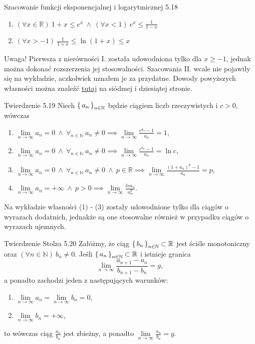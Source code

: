 \documentclass{article}
\newcommand{\R}{\mathbb{R}}
\newcommand{\N}{\mathbb{N}}
\newcommand{\lin}[1]{\lim\limits_{n\to\infty}{#1}}
\newcommand{\seq}[1]{\set{#1_n}_{n\in\N}}
\begin{document}
\begin{twier}{Szacowanie funkcji eksponencjalnej i logarytmicznej 5.18}
    \begin{enumerate}[label=\Roman*.]
        \item $(\forall x\in\R)\ 1+x\le e^x\ \land\ (\forall x<1)\ e^x\le \frac{1}{1-x}$
        \item $(\forall x>-1)\ \frac{1}{1+x}\le \ln{(1+x)}\le x$
    \end{enumerate}
\end{twier}

Uwaga! Pierwsza z nierówności I. została udowodniona tylko dla $x\ge -1$, jednak można
dokonać rozszerzenia jej stosowalności. Szacowania II. wcale nie pojawiły się na wykładzie, aczkolwiek uznałem je
za przydatne. Dowody powyższych własności można znaleźć 
\href{https://drive.google.com/file/d/1cHNY7oU4XpRmYcPfO8lCgPCpdmvKQY5q/view?usp=sharing}{{\color{blue}\underline{tutaj}}}
na siódmej i dziesiątej stronie.

\begin{twier}{Twierdzenie 5.19}
Niech $\seq{a}$ będzie ciągiem liczb rzeczywistych i $c>0$, wówczas
\begin{enumerate}[label=(\arabic*)]
    \item $\lin{a_n}=0\ \land\ \forall_{n\in\N}\ a_n\neq0\implies\lin{\frac{e^{a_n}-1}{a_n}}=1$,
    \item $\lin{a_n}=0\ \land\ \forall_{n\in\N}\ a_n\neq0\implies\lin{\frac{c^{a_n}-1}{a_n}}=\ln{c}$,
    \item $\lin{a_n}=0\ \land\ \forall_{n\in\N}\ a_n\neq0\ \land\ p\in\R\implies\lin{\frac{(1+a_n)^p-1}{a_n}}=p$,
    \item $\lin{a_n}=+\infty\ \land\ p>0\implies \lin{\frac{ln{a_n}}{a_n^p}}$.
\end{enumerate}
\end{twier}

Na wykładzie własności (1) - (3) zostały udowodnione tylko dla ciągów o wyrazach dodatnich, jednakże są one stosowalne
również w przypadku ciągów o wyrazach ujemnych.

\begin{twier}{Twierdzenie Stolza 5.20}
Załóżmy, że ciąg $\seq{b}\subset\R$ jest ściśle monotoniczny oraz $(\forall n\in\N)\ b_n\neq0$. Jeśli $\seq{a}\subset\R$
i istnieje granica
\begin{equation*}
    \lin{\frac{a_{n+1}-a_{n}}{b_{n+1}-b_{n}}}=g,
\end{equation*}
a ponadto zachodzi jeden z następujących warunków:
\begin{enumerate}[label=(\roman*)]
    \item $\lin{a_n}=\lin{b_n}=0$,
    \item $\lin{b_n}=+\infty$,
\end{enumerate}
to wówczas ciąg $\frac{a_n}{b_n}$ jest zbieżny, a ponadto $\lin{\frac{a_n}{b_n}}=g$.
\end{twier}
\end{document}
